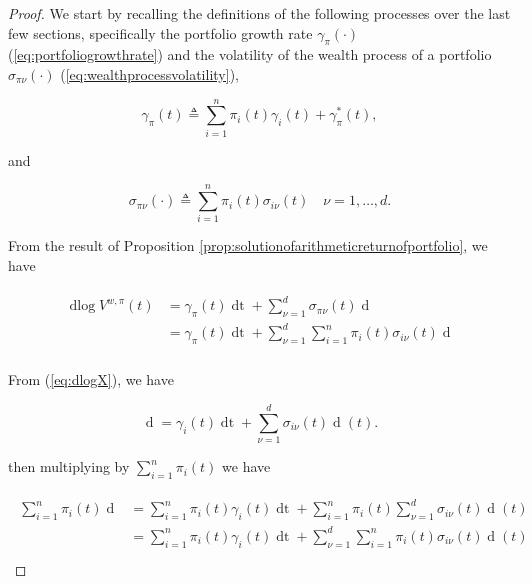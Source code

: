 \documentclass[british]{amsart} \usepackage{lmodern}
\numberwithin{equation}{section} \numberwithin{figure}{section}
\theoremstyle{plain} \newtheorem{thm}{\protect\theoremname}[section]
\theoremstyle{definition} \newtheorem{defn}[thm]{\protect\definitionname}
\theoremstyle{plain} \newtheorem{assumption}[thm]{\protect\assumptionname}
\theoremstyle{plain} \newtheorem{lem}[thm]{\protect\lemmaname}
\theoremstyle{plain} \newtheorem{prop}[thm]{\protect\propositionname}
\theoremstyle{remark} \newtheorem{rem}[thm]{\protect\remarkname}
\theoremstyle{plain} \newtheorem{cor}[thm]{\protect\corollaryname}
\renewcommand{\d}[1]{\mathop{\mathrm{d}{#1}}}
\newcommand{\defeq}{\mathop{\triangleq}} \newcommand{\almostsurely}{\text{a.s.}}
\newcommand{\V}{V^{w,\pi}}
\begin{document}
\begin{proof}
  We start by recalling the definitions of the following processes over the last
  few sections, specifically the portfolio growth rate $\gamma_{\pi}(\cdot)$
  (\ref{eq:portfoliogrowthrate}) and the volatility of the wealth process of a
  portfolio $\sigma_{\pi\nu}(\cdot)$ (\ref{eq:wealthprocessvolatility}), 
  
  \begin{equation}
    \gamma_{\pi}(t) \defeq 
      \sum_{i=1}^{n} \pi_{i}(t)\gamma_{i}(t) + \gamma_{\pi}^{*}(t),
  \end{equation}

  and

  \begin{equation}
    \sigma_{\pi\nu}(\cdot) \defeq \sum_{i=1}^{n} \pi_{i}(t) \sigma_{i\nu}(t)
    \quad \nu=1,\dots,d.
  \end{equation}

  From the result of Proposition
\ref{prop:solutionofarithmeticreturnofportfolio}, we have 

  \begin{gather}
    \begin{split}
      \label{eq:dlogVstep1}
      \d\log{\V(t)} 
      &=  
        \gamma_{\pi}(t) \d{t} +
        \sum_{\nu=1}^{d} \sigma_{\pi\nu}(t) \d{W_{\nu}(t)} \\
      &=
        \gamma_{\pi}(t) \d{t} +
        \sum_{\nu=1}^{d} \sum_{i=1}^{n} \pi_{i}(t) \sigma_{i\nu}(t) \d{W_{\nu}(t)} \\
    \end{split}
  \end{gather}

  From (\ref{eq:dlogX}), we have

  \begin{equation}
        \d{\log{X_{i}(t)}} =
          \gamma_{i}(t) \d{t} +
          \sum_{\nu=1}^{d} \sigma_{i\nu}(t) \d{W_{\nu}}(t).
  \end{equation}

  then multiplying by $\sum_{i=1}^{n} \pi_{i}(t)$ we have 
 
  \begin{gather*}
    \begin{split}
       \sum_{i=1}^{n} \pi_{i}(t) \d{\log{X_{i}(t)}} 
        &=
          \sum_{i=1}^{n} \pi_{i}(t) \gamma_{i}(t) \d{t} +
          \sum_{i=1}^{n} \pi_{i}(t) \sum_{\nu=1}^{d} \sigma_{i\nu}(t) \d{W_{\nu}}(t) \\
        &=
          \sum_{i=1}^{n} \pi_{i}(t) \gamma_{i}(t) \d{t} +
          \sum_{\nu=1}^{d} \sum_{i=1}^{n} \pi_{i}(t) \sigma_{i\nu}(t) \d{W_{\nu}}(t) \\
    \end{split}
  \end{gather*}


\end{proof}
\end{document}
